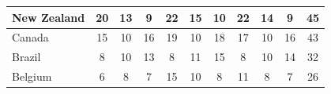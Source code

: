\documentclass[12pt]{article}  %
\begin{document}
\begin{subappendices}
\begin{longtable}{|l|c|c|c|c|c|c|c|c|c|c|}
	\hline
	New Zealand                                                    & 20                                                                     & 13                                                                     & 9                                                                      & 22                                                                     & 15                                                                     & 10                                                                     & 22                        & 14                          & 9                           & 45                          \\ 
	\hline
	Canada                                                         & 15                                                                     & 10                                                                     & 16                                                                     & 19                                                                     & 10                                                                     & 18                                                                     & 17                        & 10                          & 16                          & 43                          \\ 
	\hline
	Brazil                                                         & 8                                                                      & 10                                                                     & 13                                                                     & 8                                                                      & 11                                                                     & 15                                                                     & 8                         & 10                          & 14                          & 32                          \\ 
	\hline
	Belgium                                                        & 6                                                                      & 8                                                                      & 7                                                                      & 15                                                                     & 10                                                                     & 8                                                                      & 11                        & 8                           & 7                           & 26                          \\ 

\end{longtable}
\end{subappendices}
\end{document}
